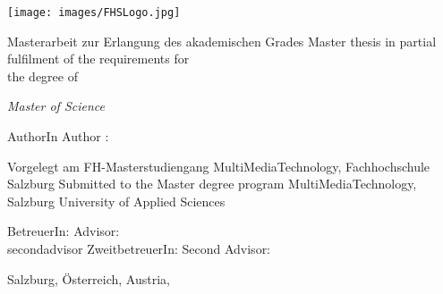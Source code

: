 \begin{titlepage}

\newcommand{\printsecondadvisor}[1]{%
  \ifcsname#1\endcsname%
  \ifmmtlanguagegerman ZweitbetreuerIn: \else Second Advisor: \fi \secondadvisor 
  \else%
    
  \fi%
}

\ifmmtmasterthesis

    
    
    \newpage
    
    \thispagestyle{empty}
    
    \hfill \texttt{[image: images/FHSLogo.jpg]}
    
    \vspace*{2cm}
    
    \Large{
    \titlename
    
    \vspace*{1cm}
    
    \ifmmtlanguagegerman
    Masterarbeit zur Erlangung des akademischen Grades
    \else
    Master thesis in partial fulfilment of the requirements for\\ the degree of 
    \fi
    
    \vspace*{0.5cm}
    
    \textit{Master of Science}
    }
    
    
    \vspace*{1.5cm}
    {\large
    \ifmmtlanguagegerman AuthorIn \else Author \fi: \authorname
    }
    \vfill
    
    {\normalsize
    \ifmmtlanguagegerman
    Vorgelegt am FH-Masterstudiengang MultiMediaTechnology, Fachhochschule Salzburg
    \else
    Submitted to the Master degree program MultiMediaTechnology, Salzburg University of Applied Sciences
    \fi
    
    
    \vspace*{1cm}
    
    \ifmmtlanguagegerman BetreuerIn: \else Advisor: \fi
    \advisor
    \\    
    \printsecondadvisor{secondadvisor}
    
    \vfill
    
    Salzburg, \ifmmtlanguagegerman Österreich, \else Austria, \fi  \thesisdate
    }


\end{titlepage}
